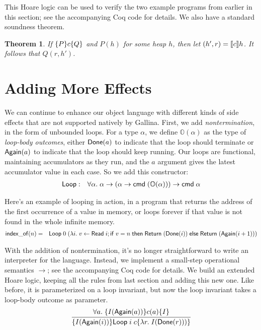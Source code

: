 \documentclass{amsbook}
\newtheorem{theorem}{Theorem}[chapter]
\theoremstyle{definition}
\theoremstyle{remark}
\numberwithin{section}{chapter}
\numberwithin{equation}{chapter}
\begin{document}
This Hoare logic can be used to verify the two example programs from earlier in this section; see the accompanying Coq code for details.
We also have a standard soundness theorem.
\begin{theorem}
  If $\{P\} c \{Q\}$ and $P(h)$ for some heap $h$, then let $(h', r) = {\left \llbracket c \right \rrbracket}h$.  It follows that $Q(r, h')$.
\end{theorem}


\section{Adding More Effects}

We can continue to enhance our object language with different kinds of side effects that are not supported natively by Gallina.
First, we add \emph{nontermination}, in the form of unbounded loops.
For a type $\alpha$, we define $\mathbb O(\alpha)$ as the type of \emph{loop-body outcomes}, either $\mathsf{Done}(a)$ to indicate that the loop should terminate or $\mathsf{Again}(a)$ to indicate that the loop should keep running.
Our loops are functional, maintaining accumulators as they run, and the $a$ argument gives the latest accumulator value in each case.
So we add this constructor:
\begin{eqnarray*}
  \mathsf{Loop} &:& \forall \alpha. \; \alpha \to (\alpha \to \mathsf{cmd} \; (\mathbb O(\alpha))) \to \mathsf{cmd} \; \alpha
\end{eqnarray*}

Here's an example of looping in action, in a program that returns the address of the first occurrence of a value in memory, or loops forever if that value is not found in the whole infinite memory.
\begin{eqnarray*}
  \mathsf{index\_of}(n) &=& \mathsf{Loop} \; 0 \; (\lambda i. \; v \leftarrow \mathsf{Read} \; i; \mathsf{if} \; v = n \; \mathsf{then} \; \mathsf{Return} \; (\mathsf{Done}(i)) \; \mathsf{else} \; \mathsf{Return} \; (\mathsf{Again}(i+1)))
\end{eqnarray*}

With the addition of nontermination, it's no longer straightforward to write an interpreter for the language.
Instead, we implement a small-step operational semantics $\to$; see the accompanying Coq code for details.
We build an extended Hoare logic, keeping all the rules from last section and adding this new one.
\invariants
Like before, it is parameterized on a loop invariant, but now the loop invariant takes a loop-body outcome as parameter.
$$\infer{\hoare{I(\mt{Again}(i))}{\mt{Loop} \; i \; c}{\lambda r. \; I(\mt{Done}(r)))}}{
  \forall a. \; \hoare{I(\mt{Again}(a))}{c(a)}{I}
}$$
\end{document}
